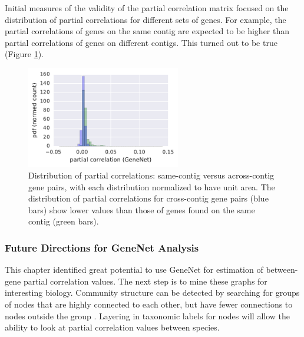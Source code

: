 Initial measures of the validity of the partial correlation matrix focused on the distribution of partial correlations for different sets of genes.
For example, the partial correlations of genes on the same contig are expected to be higher than partial correlations of genes on different contigs. 
This turned out to be true (Figure \ref{fig:pcor_same_and_cross_contigs}).

\begin{figure}[H]
\centering
    \includegraphics[width=0.6\textwidth]{./tex/chapter3/figures/170407_same-contig_and_cross-contig_pcor_distributions.pdf}
    \begin{singlespace}
    \caption[Distribution of partial correlations: same-contig versus across-contig gene pairs]{
    	Distribution of partial correlations: same-contig versus across-contig gene pairs, with each distribution normalized to have unit area.
	The distribution of partial correlations for cross-contig gene pairs (blue bars) show lower values than those of genes found on the same contig (green bars).
        }
    \label{fig:pcor_same_and_cross_contigs}
    \end{singlespace}
\end{figure}




\subsubsection{Future Directions for GeneNet Analysis}

This chapter identified great potential to use GeneNet for estimation of between-gene partial correlation values.
The next step is to mine these graphs for interesting biology.
Community structure can be detected by searching for groups of nodes that are highly connected to each other, but have fewer connections to nodes outside the group \cite{girvan2002}.
Layering in taxonomic labels for nodes will allow the ability to look at partial correlation values between species.

